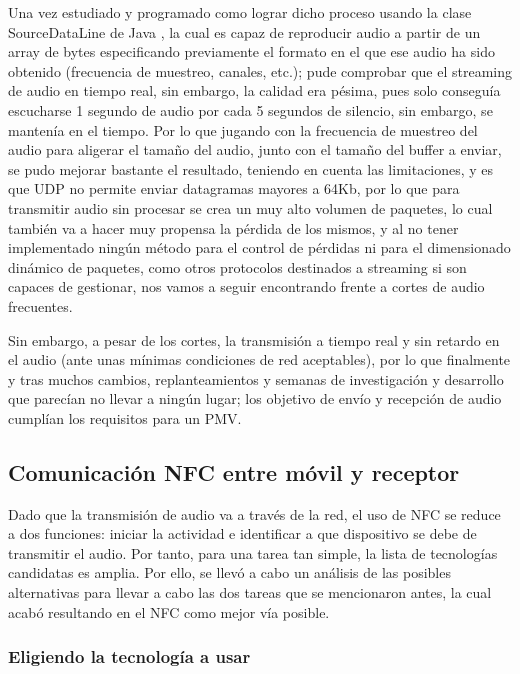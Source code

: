 Una vez estudiado y programado como lograr dicho proceso usando la clase
SourceDataLine de Java \cite{java-SourceDataLine}, la cual es capaz de
reproducir audio a partir de un array de bytes especificando previamente el
formato en el que ese audio ha sido obtenido (frecuencia de muestreo, canales,
etc.); pude comprobar que el streaming de audio en tiempo real, sin embargo, la
calidad era pésima, pues solo conseguía escucharse 1 segundo de audio por cada 5
segundos de silencio, sin embargo, se mantenía en el tiempo. Por lo que jugando
con la frecuencia de muestreo del audio para aligerar el tamaño del audio, junto
con el tamaño del buffer a enviar, se pudo mejorar bastante el resultado,
teniendo en cuenta las limitaciones, y es que UDP no permite enviar datagramas
mayores a 64Kb, por lo que para transmitir audio sin procesar se crea un muy
alto volumen de paquetes, lo cual también va a hacer muy propensa la pérdida de
los mismos, y al no tener implementado ningún método para el control de pérdidas
ni para el dimensionado dinámico de paquetes, como otros protocolos destinados a
streaming si son capaces de gestionar, nos vamos a seguir encontrando frente a
cortes de audio frecuentes. 

Sin embargo, a pesar de los cortes, la transmisión a tiempo real y sin retardo en
el audio (ante unas mínimas condiciones de red aceptables), por lo que
finalmente y tras muchos cambios, replanteamientos y semanas de investigación y
desarrollo que parecían no llevar a ningún lugar; los objetivo de envío y
recepción de audio cumplían los requisitos para un PMV.


\subsection{Comunicación NFC entre móvil y receptor}

Dado que la transmisión de audio va a través de la red, el uso de NFC se reduce
a dos funciones: iniciar la actividad e identificar a que dispositivo se debe de
transmitir el audio. Por tanto, para una tarea tan simple, la lista de
tecnologías candidatas es amplia. Por ello, se llevó a cabo un análisis de las
posibles alternativas para llevar a cabo las dos tareas que se mencionaron
antes, la cual acabó resultando en el NFC como mejor vía posible.

\subsubsection{Eligiendo la tecnología a usar}

